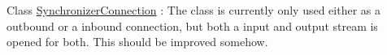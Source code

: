 \label{todo__todo000001}
\hypertarget{todo__todo000001}{}
 
\begin{DoxyDescription}
\item[Class \hyperlink{interface_synchronizer_connection}{SynchronizerConnection} ]: The class is currently only used either as a outbound or a inbound connection, but both a input and output stream is opened for both. This should be improved somehow. 
\end{DoxyDescription}